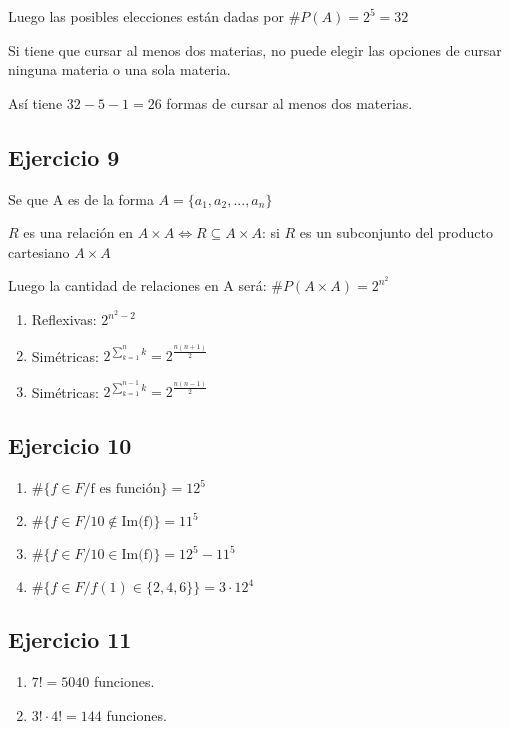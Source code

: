 Luego las posibles elecciones están dadas por $ \#P(A) = 2^5 = 32 $

Si tiene que cursar al menos dos materias, no puede elegir las opciones de cursar ninguna materia o una sola materia.

Así tiene $ 32 - 5 - 1 = 26 $ formas de cursar al menos dos materias.

\subsection{Ejercicio 9}

Se que A es de la forma $ A = \{ a_1, a_2, ... , a_n \} $

$R$ es una relación en $ A \times A \iff R \subseteq A \times A $: si $R$ es un subconjunto del producto cartesiano $ A \times A $

Luego la cantidad de relaciones en A será: $ \# P(A \times A) = 2^{n^2}$

\begin{enumerate}
    \item Reflexivas: $ 2^{n^2-2} $
    \item Simétricas: $ 2^{\sum_{k =1}^{n}k} = 2^{\frac{n(n+1)}{2}} $
    \item Simétricas: $ 2^{\sum_{k =1}^{n-1}k} = 2^{\frac{n(n-1)}{2}} $
\end{enumerate}

\subsection{Ejercicio 10}
\begin{enumerate}
    \item $ \#\{ f \in F / \text{f es función}\} = 12^5 $
    \item $ \#\{ f \in F / 10 \not \in \text{Im(f)} \} = 11^5 $
    \item $ \#\{ f \in F / 10 \in \text{Im(f)} \} = 12^5 - 11^5 $
    \item $ \#\{ f \in F / f(1) \in \{ 2,4,6 \} \} = 3 \cdot 12^4 $
\end{enumerate}

\subsection{Ejercicio 11}

\begin{enumerate}
    \item $7! = 5040$ funciones.
    \item $3! \cdot 4! = 144$ funciones.
\end{enumerate}


